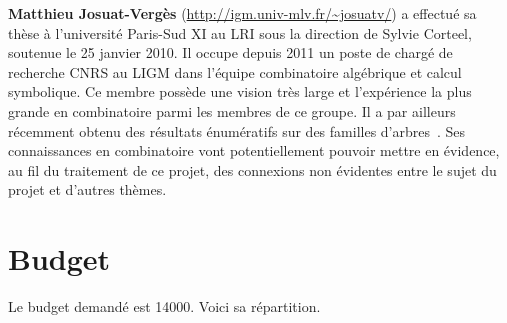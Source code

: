 \documentclass[10pt,reqno]{amsart}
\numberwithin{equation}{subsection}
\begin{document}
{\bf Matthieu Josuat-Vergès} (\url{http://igm.univ-mlv.fr/~josuatv/})
a effectué sa thèse à l'université Paris-Sud XI au LRI sous la
direction de Sylvie Corteel, soutenue le 25 janvier 2010. Il occupe
depuis 2011 un poste de chargé de recherche CNRS au LIGM dans l'équipe
combinatoire algébrique et calcul symbolique. Ce membre possède une
vision très large et l'expérience la plus grande en combinatoire parmi
les membres de ce groupe. Il a par ailleurs récemment obtenu des
résultats énumératifs sur des familles d'arbres~\cite{JV15}. Ses
connaissances en combinatoire vont potentiellement pouvoir mettre en
évidence, au fil du traitement de ce projet, des connexions non
évidentes entre le sujet du projet et d'autres thèmes.

\section{Budget}
Le budget demandé est 14000\texteuro. Voici sa répartition.
\end{document}
